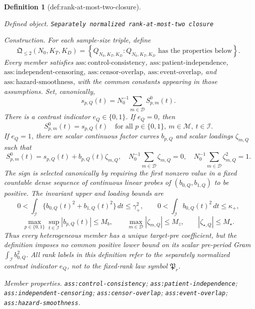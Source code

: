\documentclass{article}
\newtheorem{definition}{Definition}
\begin{document}
\begin{definition}[def:rank-at-most-two-closure]\label{def:rank-at-most-two-closure}
\par\smallskip\noindent\emph{Defined object.} \texttt{Separately normalized rank-\allowbreak{}at-\allowbreak{}most-\allowbreak{}two closure}
\par\smallskip\noindent\emph{Construction.} For each sample-size triple, define
\[
\mathfrak Q_{\leq 2}(N_0,K_T,K_D)
=\left\{Q_{N_0,K_T,K_D}:Q_{N_0,K_T,K_D}
\text{ has the properties below}\right\}.
\]
Every member satisfies
\(\mathrm{ass:control\mbox{-}consistency}\),
\(\mathrm{ass:patient\mbox{-}independence}\),
\(\mathrm{ass:independent\mbox{-}censoring}\),
\(\mathrm{ass:censor\mbox{-}overlap}\),
\(\mathrm{ass:event\mbox{-}overlap}\), and
\(\mathrm{ass:hazard\mbox{-}smoothness}\), with the common constants appearing in
those assumptions.  Set, canonically,
\[
s_{p,Q}(t)=N_0^{-1}\sum_{m\in\mathcal D}S^0_{p,m}(t).
\]
There is a contrast indicator \(e_Q\in\{0,1\}\).  If \(e_Q=0\), then
\[
S^0_{p,m}(t)=s_{p,Q}(t)
\quad\text{for all }p\in\{0,1\},\ m\in\mathcal M,\ t\in\mathcal I.
\]
If \(e_Q=1\), there are scalar continuous factor curves \(b_{p,Q}\) and scalar
loadings \(\zeta_{m,Q}\) such that
\[
S^0_{p,m}(t)=s_{p,Q}(t)+b_{p,Q}(t)\zeta_{m,Q},
\quad
N_0^{-1}\sum_{m\in\mathcal D}\zeta_{m,Q}=0,
\quad
N_0^{-1}\sum_{m\in\mathcal D}\zeta_{m,Q}^2=1.
\]
The sign is selected canonically by requiring the first nonzero value in a fixed
countable dense sequence of continuous linear probes of
\((b_{0,Q},b_{1,Q})\) to be positive.  The invariant upper and loading bounds are
\[
0<\int_{\mathcal I}\{b_{0,Q}(t)^2+b_{1,Q}(t)^2\}\,dt\leq\gamma_+^2,
\qquad
0<\int_{\mathcal I}b_{0,Q}(t)^2\,dt\leq\kappa_+,
\]
\[
\max_{p\in\{0,1\}}\sup_{t\in\mathcal I}|b_{p,Q}(t)|\leq M_b,
\qquad
\max_{m\in\mathcal D}|\zeta_{m,Q}|\leq M_z,
\qquad
|\zeta_{\star,Q}|\leq M_\star.
\]
Thus every heterogeneous member has a unique target-pre coefficient, but the
definition imposes no common positive lower bound on its scalar pre-period Gram
\(\int_{\mathcal I}b_{0,Q}^2\).  All rank labels in this definition refer to the
separately normalized contrast indicator \(e_Q\), not to the fixed-rank law symbol
\(\mathfrak P_r\).
\par\smallskip\noindent\emph{Member properties.} \texttt{ass:\allowbreak{}control-\allowbreak{}consistency}; \texttt{ass:\allowbreak{}patient-\allowbreak{}independence}; \texttt{ass:\allowbreak{}independent-\allowbreak{}censoring}; \texttt{ass:\allowbreak{}censor-\allowbreak{}overlap}; \texttt{ass:\allowbreak{}event-\allowbreak{}overlap}; \texttt{ass:\allowbreak{}hazard-\allowbreak{}smoothness}.
\end{definition}
\end{document}
